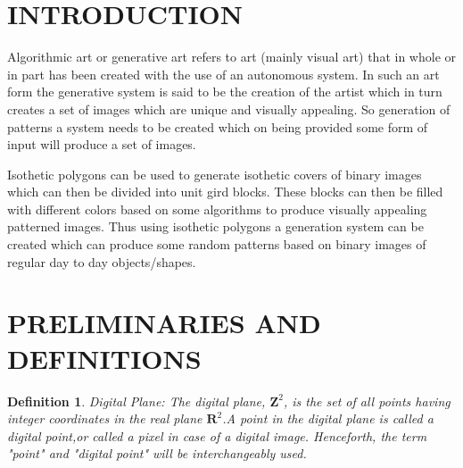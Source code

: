 \documentclass[12pt]{article}
\newtheorem{DEF}{Definition}
\begin{document}
\newpage
\tableofcontents
\newpage
\newenvironment{mydef}[1]{\begin{definition} #1 \mbox{\\}
\rm}{\end{definition}}




\section{INTRODUCTION}
Algorithmic art or generative art refers to art (mainly visual art) that in whole or in part has been created with the use of an autonomous system. In such an art form the generative system is said to be the creation of the artist which in turn creates a set of images which are unique and visually appealing.  
So generation of patterns a system needs to be created which on being provided some form of input will produce a set of images.

\vspace{0.3cm} 
Isothetic polygons can be used to generate isothetic covers of binary images which can then be divided into unit gird blocks. These blocks can then be filled with different colors based on some algorithms to produce visually appealing patterned images. Thus using isothetic polygons a generation system can be created which can produce some random patterns based on binary images of regular day to day objects/shapes. 
\vspace{0.3cm}





\newpage





\section{PRELIMINARIES AND DEFINITIONS}
\begin{DEF}
  \textnormal{Digital Plane}: The digital plane, $\textbf{Z}^2$, is the set of all points having integer coordinates in the real plane $\textbf{R}^2$.A point in the digital plane is called a digital point,or called a pixel in case of a digital image. Henceforth, the term "point" and "digital point" will be interchangeably used.
\end{DEF}
\end{document}
